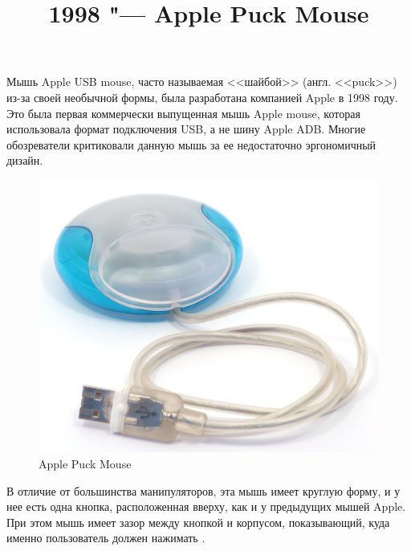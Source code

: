 \documentclass[11pt, a4paper]{article}
\begin{document}
\title{1998 "--- Apple Puck Mouse}
\date{}
\maketitle
{}
Мышь Apple USB mouse, часто называемая <<шайбой>> (англ. <<puck>>)  из-за своей необычной формы, была разработана компанией Apple в 1998 году. Это была первая коммерчески выпущенная мышь Apple mouse, которая использовала формат подключения USB, а не шину Apple ADB. Многие обозреватели критиковали данную мышь за ее недостаточно эргономичный дизайн.

\begin{figure}[h]
    \centering
    \includegraphics[scale=0.8]{1998_apple_puck/apple60.jpg}
    \caption{Apple Puck Mouse}
    \label{fig:pic}
\end{figure}

В отличие от большинства манипуляторов, эта мышь имеет круглую форму, и у нее есть одна кнопка, расположенная вверху, как и у предыдущих мышей Apple. При этом мышь имеет зазор между кнопкой и корпусом, показывающий, куда именно пользователь должен нажимать \cite{Apple}.
\end{document}
